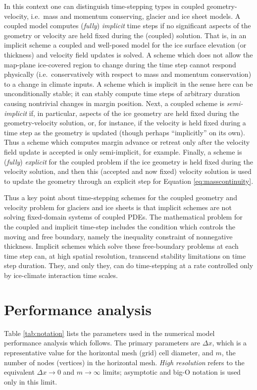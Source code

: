 \documentclass[review,letterpaper]{igs}
\begin{document}
In this context one can distinguish time-stepping types in coupled geometry-velocity, i.e.~mass and momentum conserving, glacier and ice sheet models.  A coupled model computes (\emph{fully}) \emph{implicit} time steps if no significant aspects of the geometry or velocity are held fixed during the (coupled) solution.  That is, in an implicit scheme a coupled and well-posed model for the ice surface elevation (or thickness) and velocity field updates is solved.  A scheme which does not allow the map-plane ice-covered region to change during the time step cannot respond physically (i.e.~conservatively with respect to mass and momentum conservation) to a change in climate inputs.  A scheme which is implicit in the sense here can be unconditionally stable; it can stably compute time steps of arbitrary duration causing nontrivial changes in margin position.  Next, a coupled scheme is \emph{semi-implicit} if, in particular, aspects of the ice geometry are held fixed during the geometry-velocity solution, or, for instance, if the velocity is held fixed during a time step as the geometry is updated (though perhaps ``implicitly'' on its own).  Thus a scheme which computes margin advance or retreat only after the velocity field update is accepted is only semi-implicit, for example.  Finally, a scheme is (\emph{fully}) \emph{explicit} for the coupled problem if the ice geometry is held fixed during the velocity solution, and then this (accepted and now fixed) velocity solution is used to update the geometry through an explicit step for Equation \eqref{eq:masscontinuity}.

Thus a key point about time-stepping schemes for the coupled geometry and velocity problem for glaciers and ice sheets is that implicit schemes are not solving fixed-domain systems of coupled PDEs.  The mathematical problem for the coupled and implicit time-step includes the condition which controls the moving and free boundary, namely the inequality constraint of nonnegative thickness.  Implicit schemes which solve these free-boundary problems at each time step can, at high spatial resolution, transcend stability limitations on time step duration.  They, and only they, can do time-stepping at a rate controlled only by ice-climate interaction time scales.


\section{Performance analysis}

Table \ref{tab:notation} lists the parameters used in the numerical model performance analysis which follows.  The primary parameters are $\Delta x$, which is a representative value for the horizontal mesh (grid) cell diameter, and $m$, the number of nodes (vertices) in the horizontal mesh.  \emph{High resolution} refers to the equivalent $\Delta x\to 0$ and $m\to\infty$ limits; asymptotic and big-O notation is used only in this limit.
\end{document}

